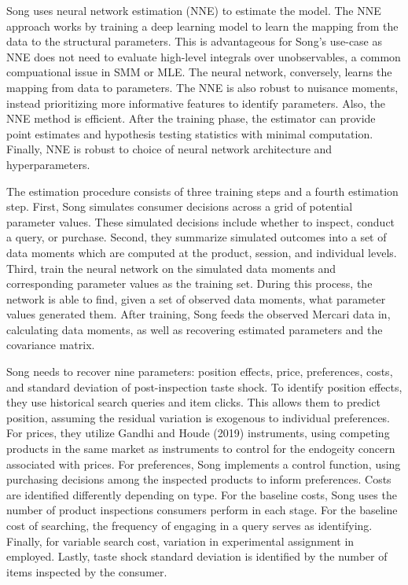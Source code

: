 \documentclass[11pt]{article}
\theoremstyle{definition}
\theoremstyle{remark}
\begin{document}
Song uses neural network estimation (NNE) to estimate the model. The NNE approach works by training a deep learning model to learn the mapping from the data to the 
structural parameters. This is advantageous for Song's use-case as NNE does not need to evaluate high-level integrals over unobservables, a common compuational issue
in SMM or MLE. The neural network, conversely, learns the mapping from data to parameters. The NNE is also robust to nuisance moments, instead prioritizing more informative
features to identify parameters. Also, the NNE method is efficient. After the training phase, the estimator can provide point estimates and hypothesis testing statistics 
with minimal computation. Finally, NNE is robust to choice of neural network architecture and hyperparameters.

The estimation procedure consists of three training steps and a fourth estimation step. First, Song simulates consumer decisions across a grid of potential parameter values.
These simulated decisions include whether to inspect, conduct a query, or purchase. Second, they summarize simulated outcomes into a set of data moments which are computed
at the product, session, and individual levels. Third, train the neural network on the simulated data moments and corresponding parameter values as the training set. During
this process, the network is able to find, given a set of observed data moments, what parameter values generated them. After training, Song feeds the observed Mercari data in,
calculating data moments, as well as recovering estimated parameters and the covariance matrix.

Song needs to recover nine parameters: position effects, price, preferences, costs, and standard deviation of post-inspection taste shock. To identify position effects, they use 
historical search queries and item clicks. This allows them to predict position, assuming the residual variation is exogenous to individual preferences. For prices, they utilize
Gandhi and Houde (2019) instruments, using competing products in the same market as instruments to control for the endogeity concern associated with prices. For preferences, Song
implements a control function, using purchasing decisions among the inspected products to inform preferences. Costs are identified differently depending on type. For the baseline costs,
Song uses the number of product inspections consumers perform in each stage. For the baseline cost of searching, the frequency of engaging in a query serves as identifying.
Finally, for variable search cost, variation in experimental assignment in employed. Lastly, taste shock standard deviation is identified by the number of items inspected by the consumer.
\end{document}
